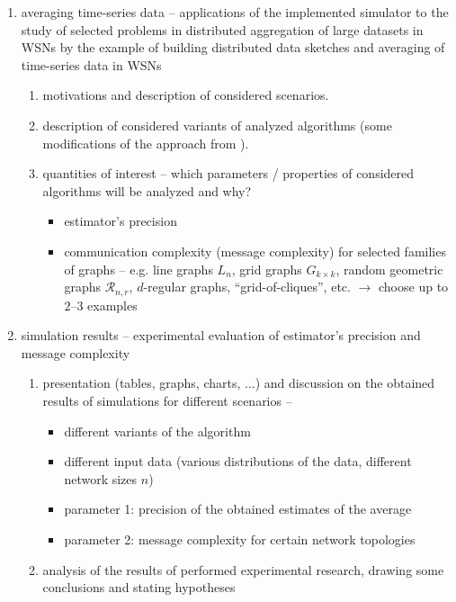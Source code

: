\documentclass[a4paper, 12pt]{article}
\begin{document}
\begin{enumerate}[label*=\arabic*.]
	\item averaging time-series data -- applications of the implemented simulator to the study of selected problems in distributed aggregation of large datasets in WSNs
		  by the example of building distributed data sketches and averaging of time-series data in WSNs
		  \begin{enumerate}[label*=\arabic*.]
		  	\item motivations and description of considered scenarios.
		  	\item description of considered variants of analyzed algorithms (some modifications of the approach from \cite{Nugroho:2020:AveragingTS}).
		  	\item quantities of interest -- which parameters / properties of considered algorithms will be analyzed and why? 
		  		\begin{itemize}
		  			\item estimator's precision
		  			\item communication complexity (message complexity) for selected families of graphs -- e.g. line graphs $L_n$, grid graphs $G_{k \times k}$,
		  				  random geometric graphs $\mathcal{R}_{n,r}$, 
		  			$d$-regular graphs, ``grid-of-cliques'', etc. $\rightarrow$ choose up to $2$--$3$ examples
		  		\end{itemize} 
		  \end{enumerate} 
	  
	 \item simulation results -- experimental evaluation of estimator's precision and message complexity
		 \begin{enumerate}[label*=\arabic*.]
		 	\item presentation (tables, graphs, charts, ...) and discussion on the obtained results of simulations for different scenarios -- 
		 		\begin{itemize}
		 			\item different variants of the algorithm
		 			\item different input data (various distributions of the data, different network sizes $n$)
		 			\item parameter 1: precision of the obtained estimates of the average
		 			\item parameter 2: message complexity for certain network topologies
		 		\end{itemize}
	 		\item analysis of the results of performed experimental research, drawing some conclusions and stating hypotheses
		 \end{enumerate} 
	 

\end{enumerate}
\end{document}
